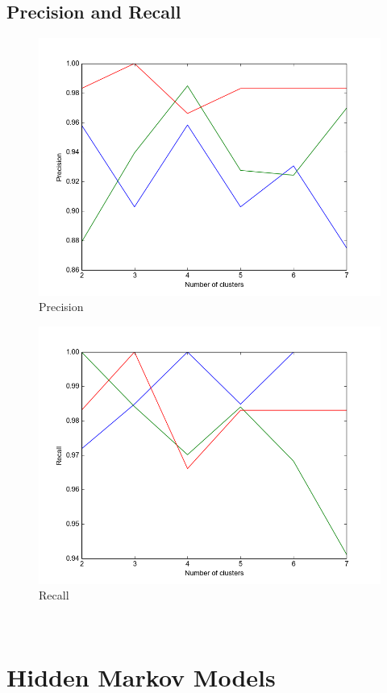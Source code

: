 \documentclass[11pt,a4paper]{article}
\begin{document}
\subsection{Precision and Recall}

\begin{minipage}[b]{0.5\textwidth}
\begin{figure}[H]
  \centering
  \includegraphics[width=.8\linewidth]{Figures/GMM_precisionvsk_BGR.png}
  \caption{Precision}
  \label{fig:sfig1}
\end{figure}%
\end{minipage}
\begin{minipage}[b]{0.5\textwidth}
\begin{figure}[H]
  \centering
  \includegraphics[width=.8\linewidth]{Figures/GMM_recallvsk_BGR.png}
\caption{Recall}
  \label{fig:sfig1}
\end{figure}%
\end{minipage}
\\
\section{Hidden Markov Models}
\end{document}

